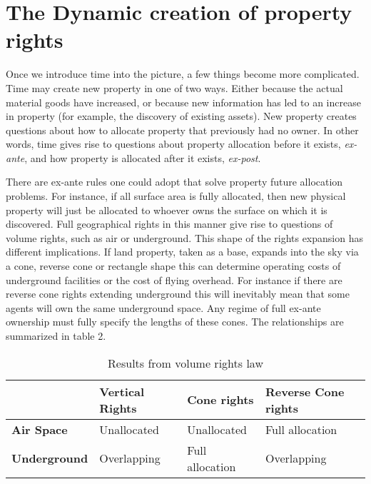 \newpage

\section{The Dynamic creation of property rights}\label{dynamic}

Once we introduce time into the picture, a few things become more complicated. Time may create new property in one of two ways. Either because the actual material goods have increased, or because new information has led to an increase in property (for example, the discovery of existing assets). New property creates questions about how to allocate property that previously had no owner. In other words, time gives rise to questions about property allocation before it exists, \textit{ex-ante}, and how property is allocated after it exists, \textit{ex-post}.

There are ex-ante rules one could adopt that solve property future allocation problems. For instance, if all surface area is fully allocated, then new physical property will just be allocated to whoever owns the surface on which it is discovered. Full geographical rights in this manner give rise to questions of volume rights, such as air or underground. This shape of the rights expansion has different implications. If land property, taken as a base, expands into the sky via a cone, reverse cone or rectangle shape this can determine operating costs of underground facilities or the cost of flying overhead. For instance if there are reverse cone rights extending underground this will inevitably mean that some agents will own the same underground space. Any regime of full ex-ante ownership must fully specify the lengths of these cones. The relationships are summarized in table 2.

\begin{table}[h]
\begin{tabular}{|l|l|l|l|}
\hline
                     & \textbf{Vertical Rights}       & \textbf{Cone rights}          & \textbf{Reverse Cone rights}  \\ \hline
\textbf{Air Space}   & Unallocated             & Unallocated            & Full allocation \\ \hline
\textbf{Underground} & Overlapping & Full allocation & Overlapping       \\ \hline
\end{tabular}
\caption{Results from volume rights law}
\label{Volume}
\end{table}

